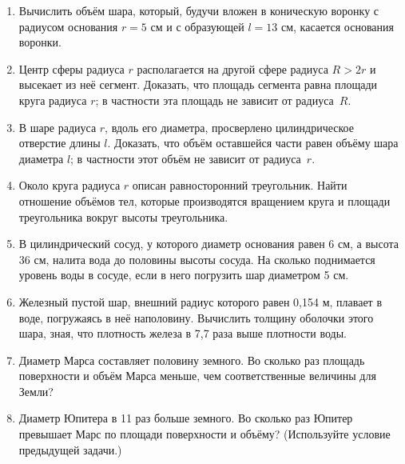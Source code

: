 {\begin{enumerate}[noitemsep]
\item
Вычислить объём шара, который, будучи вложен в коническую воронку с радиусом основания $r = 5$ см и с образующей $l = 13$ см, касается основания воронки.

\item
Центр сферы радиуса $r$ располагается на другой сфере радиуса $R>2r$ и высекает из неё сегмент.
Доказать, что площадь сегмента равна площади круга радиуса $r$; в частности эта площадь не зависит от радиуса~$R$.


\item
В шаре радиуса $r$, вдоль его диаметра, просверлено цилиндрическое отверстие длины $l$.
Доказать, что объём оставшейся части равен объёму шара диаметра $l$; в частности этот объём не зависит от радиуса~$r$.

\item
Около круга радиуса $r$ описан равносторонний треугольник.
Найти отношение объёмов тел, которые производятся вращением круга и площади треугольника вокруг высоты треугольника.

\item
В цилиндрический сосуд, у которого диаметр основания равен 6 см, а высота 36 см, налита вода до половины высоты сосуда.
На сколько поднимается уровень воды в сосуде, если в него погрузить шар диаметром 5 см.

\item
Железный пустой шар, внешний радиус которого равен 0,154 м, плавает в воде, погружаясь в неё наполовину.
Вычислить толщину оболочки этого шара, зная, что плотность железа в 7,7 раза выше плотности воды.

\item
Диаметр Марса составляет половину земного.
Во сколько раз площадь поверхности и объём Марса меньше, чем соответственные величины для Земли?

\item
Диаметр Юпитера в 11 раз больше земного.
Во сколько раз Юпитер превышает Марс по площади поверхности и объёму? (Используйте условие предыдущей задачи.)
\end{enumerate}

}

